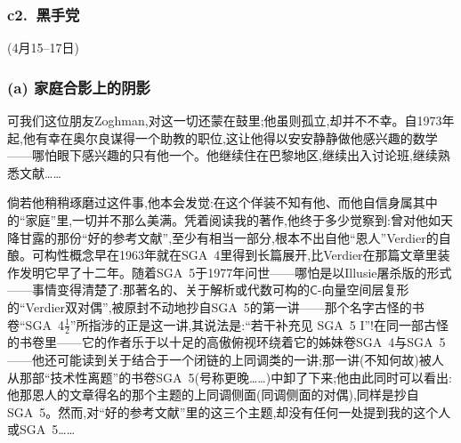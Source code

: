 \subsubsection*{c2.~黑手党}



\noindent (4月15--17日)

\subsubsection*{(a) 家庭合影上的阴影}


\noindent 可我们这位朋友Zoghman,对这一切还蒙在鼓里;他虽则孤立,却并不不幸。自1973年起,他有幸在奥尔良谋得一个助教的职位,这让他得以安安静静做他感兴趣的数学——哪怕眼下感兴趣的只有他一个。他继续住在巴黎地区,继续出入讨论班,继续熟悉文献……

\noindent 倘若他稍稍琢磨过这件事,他本会发觉:在这个佯装不知有他、而他自信身属其中的“家庭”里,一切并不那么美满。凭着阅读我的著作,他终于多少觉察到:曾对他如天降甘露的那份“好的参考文献”,至少有相当一部分,根本不出自他“恩人”Verdier的自酿。可构性概念早在1963年就在SGA~4里得到长篇展开,比Verdier在那篇文章里装作发明它早了十二年。随着SGA~5于1977年问世——哪怕是以Illusie屠杀版的形式——事情变得清楚了:那著名的、关于解析或代数可构的$\mathsf{C}$-向量空间层复形的“Verdier双对偶”,被原封不动地\dmark{}抄自SGA~5的第一讲——那个名字古怪的书卷“SGA~4$\frac{1}{2}$”所指涉的正是这一讲,其说法是:“若干补充见 SGA~5 I”!在同一部古怪的书卷里——它的作者乐于以十足的高傲俯视环绕着它的姊妹卷SGA~4与SGA~5——他还可能读到关于结合于一个闭链的上同调类的一讲;那一讲(不知何故)被人从那部“技术性离题”的书卷SGA~5(号称更晚……)中卸了下来;他由此同时可以看出:他那恩人的文章得名的那个主题的上同调侧面(同调侧面的对偶),同样是抄自SGA~5。然而,对“好的参考文献”里的这三个主题,却没有任何一处提到我的这个人或SGA~5……

